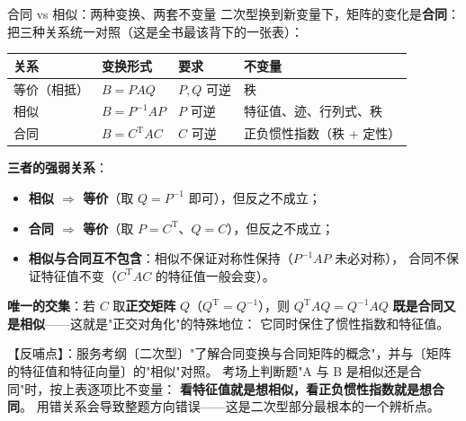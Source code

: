 \begin{fdeep}{合同 vs 相似：两种变换、两套不变量}
二次型换到新变量下，矩阵的变化是\textbf{合同}：
把三种关系统一对照（这是全书最该背下的一张表）：

\begin{center}
\begin{tabular}{@{}llll@{}}
\toprule
关系 & 变换形式 & 要求 & 不变量 \\
\midrule
等价（相抵） & $B=PAQ$ & $P,Q$ 可逆 & 秩 \\
相似 & $B=P^{-1}AP$ & $P$ 可逆 & 特征值、迹、行列式、秩 \\
合同 & $B=C^{\mathrm T}AC$ & $C$ 可逆 & 正负惯性指数（秩 + 定性） \\
\bottomrule
\end{tabular}
\end{center}

\textbf{三者的强弱关系}：
\begin{itemize}[leftmargin=2.2em,itemsep=0.22em]
\item \textbf{相似 $\Rightarrow$ 等价}（取 $Q=P^{-1}$ 即可），但反之不成立；
\item \textbf{合同 $\Rightarrow$ 等价}（取 $P=C^{\mathrm T}$、$Q=C$），但反之不成立；
\item \textbf{相似与合同互不包含}：相似不保证对称性保持（$P^{-1}AP$ 未必对称），
      合同不保证特征值不变（$C^{\mathrm T}AC$ 的特征值一般会变）。
\end{itemize}
\textbf{唯一的交集}：若 $C$ 取\textbf{正交矩阵} $Q$（$Q^{\mathrm T}=Q^{-1}$），则
$Q^{\mathrm T}AQ=Q^{-1}AQ$ \textbf{既是合同又是相似}——这就是"正交对角化"的特殊地位：
它同时保住了惯性指数和特征值。

【反哺点】：服务考纲〔二次型〕"了解合同变换与合同矩阵的概念"，并与〔矩阵的特征值和特征向量〕的"相似"对照。
考场上判断题"A 与 B 是相似还是合同"时，按上表逐项比不变量：
\textbf{看特征值就是想相似，看正负惯性指数就是想合同}。
用错关系会导致整题方向错误——这是二次型部分最根本的一个辨析点。
\end{fdeep}

